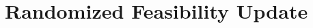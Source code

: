 \documentclass{article}
\def\dist{{\rm dist}}
\def\an#1{{\color{magenta} #1}}
\theoremstyle{plain}
\theoremstyle{definition}
\theoremstyle{remark}
\begin{document}







\section{Randomized Feasibility Update}\label{sec:RandFeas}
\end{document}
